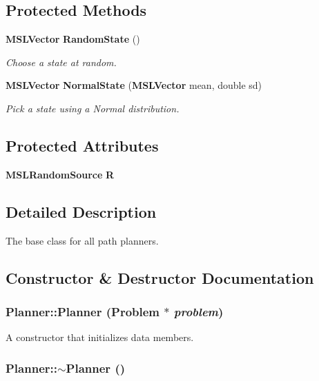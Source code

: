 \subsection*{Protected Methods}
\begin{CompactItemize}
\item 
{\bf MSLVector} {\bf Random\-State} ()
\begin{CompactList}\small\item\em Choose a state at random.\item\end{CompactList}\item 
{\bf MSLVector} {\bf Normal\-State} ({\bf MSLVector} mean, double sd)
\begin{CompactList}\small\item\em Pick a state using a Normal distribution.\item\end{CompactList}\end{CompactItemize}
\subsection*{Protected Attributes}
\begin{CompactItemize}
\item 
{\bf MSLRandom\-Source} {\bf R}
\end{CompactItemize}


\subsection{Detailed Description}
The base class for all path planners.



\subsection{Constructor \& Destructor Documentation}
\subsubsection{\setlength{\rightskip}{0pt plus 5cm}Planner::Planner ({\bf Problem} $\ast$ {\em problem})}\label{class_Planner_a0}


A constructor that initializes data members.

\subsubsection{\setlength{\rightskip}{0pt plus 5cm}Planner::$\sim$Planner ()}\label{class_Planner_a1}




